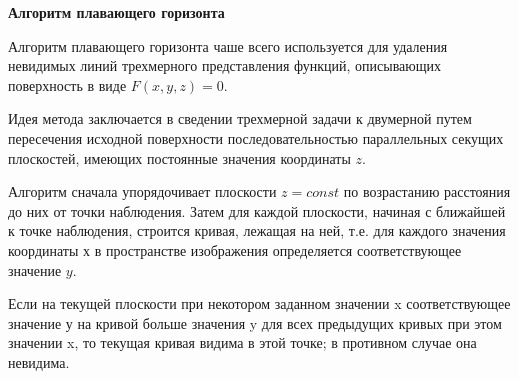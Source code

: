 \textbf{Алгоритм плавающего горизонта} %

Алгоритм плавающего горизонта чаше всего используется для удаления невидимых линий трехмерного представления функций, описывающих поверхность в виде $F(x, y, z) = 0$.

Идея метода заключается в сведении трехмерной задачи к двумерной путем пересечения исходной поверхности последовательностью параллельных секущих плоскостей, имеющих постоянные значения координаты $z$.

Алгоритм сначала упорядочивает плоскости $z = const$ по возрастанию расстояния до них от точки наблюдения. Затем для каждой плоскости, начиная с ближайшей к точке наблюдения, строится кривая, лежащая на ней, т.е. для каждого значения координаты $х$ в пространстве изображения определяется соответствующее значение $y$.

Если на текущей плоскости при некотором заданном значении x соответствующее значение у на кривой больше значения y для всех предыдущих кривых при этом значении x, то текущая кривая видима в этой точке; в противном случае она невидима.~\cite{REMOVE_FACES}\\










